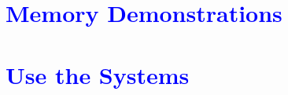     \section* {\textcolor{blue}{Memory Demonstrations}}
    \section* {\textcolor{blue}{Use the Systems}}




































